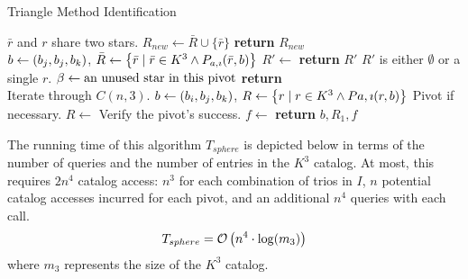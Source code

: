 \begin{algorithm}[ht]
    \caption{Triangle Method Identification} \label{algorithm:triangleIdentification}
    \begin{algorithmic}[1]
        \LineComment $\bar{r}$ and $r$ share two stars.
        \State $R_{new} \gets \bar{R} \cup \{\bar{r}\}$
        \EndIf
        \EndFor
        \State \textbf{return} $R_{new}$
        \EndFunction
        \\
        \State $b \gets (b_j, b_j, b_k)$, $\bar{R} \gets \left\{  \bar{r} \mid \bar{r} \in K^3
        \land P_{a, \imath}(\bar{r}, b)  \right\}$
        \State $R' \gets $ 
        \State \textbf{return} $R'$ \Comment $R'$ is either $\emptyset$ or a single $r$.
        \Else
        \State $\beta \gets \text{an unused star in this pivot}$
        \State \textbf{return} 
        \EndIf
        \EndFunction
        \\
          \Comment Iterate through $C(n, 3)$.
        \State $b \gets \left(b_i, b_j, b_k\right)$, $R \gets \left\{  r \mid r \in K^3
        \land P{a, \imath}(r, b)  \right\}$
         \Comment Pivot if necessary.
        \State $R \gets $ 
        \EndIf
         \Comment Verify the pivot's success.
        \State $f \gets $ 
        \invalidBijection
        \State \textbf{return} $b, R_1, f$
        \EndIf
        \EndIf
        \EndFor
        \EndFor
        \EndFor
        \EndFunction
    \end{algorithmic}
\end{algorithm}

The running time of this algorithm $T_{sphere}$ is depicted below in terms of the number of queries and the number of
entries in the $K^3$ catalog.
At most, this requires $2n^4$ catalog access: $n^3$ for each combination of trios in $I$, $n$ potential catalog
accesses incurred for each pivot, and an additional $n^4$ queries with each  call.
\begin{equation}\label{eq:sphereComplexity}
    T_{sphere} = \bigO\left( n^4 \cdot \log (m_3) \right)
\end{equation}
where $m_3$ represents the size of the $K^3$ catalog.

